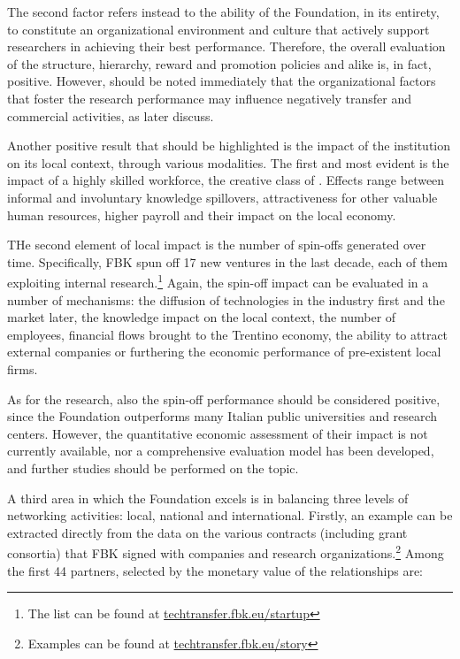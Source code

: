 The second factor refers instead to the ability of the Foundation, in its entirety, to constitute an organizational environment and culture that actively support researchers in achieving their best performance. Therefore, the overall evaluation of the structure, hierarchy, reward and promotion policies and alike is, in fact, positive. However, should be noted immediately that the organizational factors that foster the research performance may influence negatively transfer and commercial activities, as later discuss.

Another positive result that should be highlighted is the impact of the institution on its local context, through various modalities. The first and most evident is the impact of a highly skilled workforce, the creative class of \citet{Florida2002}. Effects range between informal and involuntary knowledge spillovers, attractiveness for other valuable human resources, higher payroll and their impact on the local economy. 

THe second element of local impact is the number of spin-offs generated over time. Specifically, FBK spun off 17 new ventures in the last decade, each of them exploiting internal research.\footnote{The list can be found at \href{https://techtransfer.fbk.eu/startup/}{techtransfer.fbk.eu/startup}}
Again, the spin-off impact can be evaluated in a number of mechanisms: the diffusion of technologies in the industry first and the market later, the knowledge impact on the local context, the number of employees, financial flows brought to the Trentino economy, the ability to attract external companies or furthering the economic performance of pre-existent local firms. 

As for the research, also the spin-off performance should be considered positive, since the Foundation outperforms many Italian public universities and research centers. However, the quantitative economic assessment of their impact is not currently available, nor a comprehensive evaluation model has been developed, and further studies should be performed on the topic.

A third area in which the Foundation excels is in balancing three levels of networking activities: local, national and international. Firstly, an example can be extracted directly from the data on the various contracts (including grant consortia) that FBK signed with companies and research organizations.\footnote{Examples can be found at \href{https://techtransfer.fbk.eu/story/}{techtransfer.fbk.eu/story}} Among the first 44 partners, selected by the monetary value of the relationships are:

